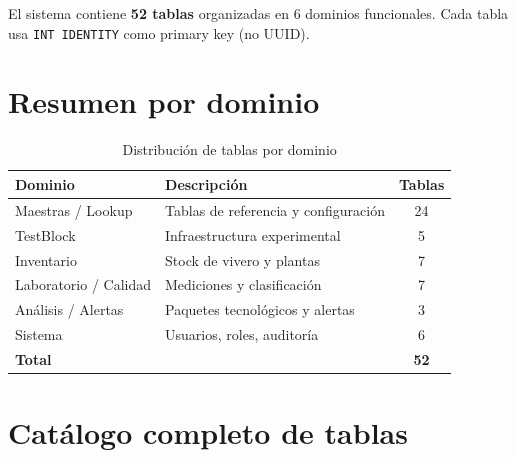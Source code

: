 \documentclass[12pt,a4paper,twoside]{report}
\begin{document}
El sistema contiene \textbf{52 tablas} organizadas en 6 dominios funcionales. Cada tabla usa \texttt{INT IDENTITY} como primary key (no UUID).

\section{Resumen por dominio}

\begin{table}[H]
\centering
\caption{Distribuci\'on de tablas por dominio}
\begin{tabular}{llc}
\toprule
\textbf{Dominio} & \textbf{Descripci\'on} & \textbf{Tablas} \\
\midrule
Maestras / Lookup     & Tablas de referencia y configuraci\'on & 24 \\
TestBlock             & Infraestructura experimental         & 5  \\
Inventario            & Stock de vivero y plantas             & 7  \\
Laboratorio / Calidad & Mediciones y clasificaci\'on           & 7  \\
An\'alisis / Alertas   & Paquetes tecnol\'ogicos y alertas      & 3  \\
Sistema               & Usuarios, roles, auditor\'ia           & 6  \\
\midrule
\textbf{Total}        &                                       & \textbf{52} \\
\bottomrule
\end{tabular}
\end{table}

\section{Cat\'alogo completo de tablas}
\end{document}
